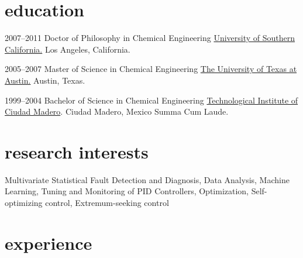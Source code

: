 \documentclass[]{friggeri-cv} %
\begin{document}
\section{education}

\begin{entrylist}


\entry
{2007--2011}
{Doctor of Philosophy {\normalfont in Chemical Engineering}}
{\flushright \href{http://chems.usc.edu}{University of Southern California.} Los Angeles, California.}


\entry
{2005--2007}
{Master of Science {\normalfont in Chemical Engineering}}
{\flushright \href{http://www.che.utexas.edu/}{The University of Texas at Austin.}
Austin, Texas.}


\entry
{1999--2004}
{Bachelor of Science {\normalfont in Chemical Engineering}}
{\flushright \href{http://www.itcm.edu.mx/}{Technological Institute of Ciudad Madero}.
Ciudad Madero, Mexico}
{Summa Cum Laude.}


\end{entrylist}


\section{research interests}
Multivariate Statistical Fault Detection and Diagnosis, Data Analysis, Machine Learning, Tuning and Monitoring of PID Controllers, Optimization, Self-optimizing control, Extremum-seeking control

\section{experience}
\end{document}

